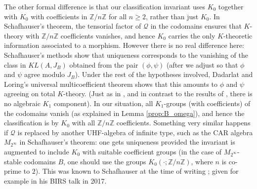\documentclass[reqno]{amsart}
\theoremstyle{definition}
\theoremstyle{remark}
\numberwithin{equation}{section}
\theoremstyle{definition}
\begin{document}
The other formal difference is that our classification invariant uses $K_0$ together with $K_0$ with coefficients in $\mathbb Z/n\mathbb Z$ for all $n\geq 2$, rather than just $K_0$. In Schafhauser's theorem, the tensorial factor of $\mathcal Q$ in the codomains ensures that $K$-theory with $\mathbb Z/n\mathbb Z$ coefficients vanishes, and hence $K_0$ carries the only $K$-theoretic information associated to a morphism. However there is no real difference here: Schafhauser's methods show that uniqueness corresponds to the vanishing of the class in $KL(A,J_B)$ obtained from the pair $(\phi,\psi)$ (after we adjust so that $\phi$ and $\psi$ agree modulo $J_B$). Under the rest of the hypotheses involved, Dadarlat and Loring's universal multicoefficient theorem shows that this amounts to $\phi$ and $\psi$ agreeing on total $K$-theory. (Just as in \cite{Schafhauser.Annals}, and in contrast to the results of \cite{CGSTW}, there is no algebraic $K_1$ component). In our situation, all $K_1$-groups (with coefficients) of the codomains vanish (as explained in Lemma \ref{prop:B_omega}), and hence the classification is by $K_0$ with all $\mathbb Z/n\mathbb Z$ coefficients. Something very similar happens if $\mathcal Q$ is replaced by another UHF-algebra of infinite type, such as the CAR algebra $M_{2^\infty}$ in Schafhauser's theorem: one gets uniqueness provided the invariant is augmented to include $K_0$ with suitable coefficient groups (in the case of $M_{2^{\infty}}$-stable codomains $B$, one should use the groups $K_0(\cdot;\mathbb Z/n\mathbb Z)$, where $n$ is co-prime to $2$).  This was known to Schafhauser at the time of writing \cite{Schafhauser.Annals}; given for example in his BIRS talk in 2017. 
\end{document}
